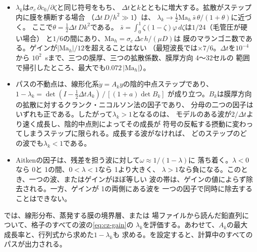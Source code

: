 \begin{itemize}
  \item $\lambda_k$は$\sigma_c\,\partial c_0/\partial\zeta$と同じ符号をもち、
    $\Delta t$と$k$とともに増大する。拡散がステップ内に膜を横断する場合
    （$\Delta t\,D/h^2 \gg 1$）は、
    $\lambda_k \to \tfrac12 \mathrm{Ma}_h\,\bar s\,\theta/(1+\theta)$に近づく。
    ここで$\theta = \tfrac12\Delta t\,D k^2$である。
    $\bar s = \int_0^1\zeta(1-\zeta)\varphi\,d\zeta$は$1/24$（毛管圧が硬い場合）
    と$1/6$の間にあり、$\mathrm{Ma}_h = \sigma_c\,\Delta c\,h/(\mu D)$は
    膜のマランゴニ数である。ゲインが$|\mathrm{Ma}_h|/12$を超えることはない
    （最短波長では$\times 7/6$。$\Delta t$を$10^{-4}$から
    $10^{2}$~\si{\second}まで、三つの膜厚、三つの拡散係数、膜厚方向 4～32セルの
    範囲で掃引したところ、最大でも$0.072\,|\mathrm{Ma}_h|$）。
  \item パスの不動点は、線形化系$\dot y = A_k y$の陰的中点ステップであり、
    $1 - \lambda_k = \det(I - \tfrac12\Delta t A_k)\,/\,[(1+a)\det B_k]$
    が成り立つ。$B_k$は膜厚方向の拡散に対するクランク・ニコルソン法の因子であり、
    分母の二つの因子はいずれも正である。したがって$\lambda_k > 1$となるのは、
    モデルのある波が$2/\Delta t$より速く成長し、陰的中点則によってその成長が
    符号の反転する摂動に変わってしまうステップに限られる。成長する波がなければ、
    どのステップのどの波でも$\lambda_k < 1$である。
  \item Aitkenの因子は、残差を担う波に対して$\omega \approx 1/(1-\lambda)$に
    落ち着く。$\lambda < 0$なら 0と 1の間、$0 < \lambda < 1$なら 1より大きく、
    $\lambda > 1$なら負になる。このとき、一つの波、またはゲインがほぼ等しい
    波の帯は、ゲインの値によらず除去される。一方、ゲインが 1の両側にある波を
    一つの因子で同時に除去することはできない。
\end{itemize}

では、線形分布、蒸発する膜の境界層、または
場ファイルから読んだ鉛直列について、格子のすべての波の\cref{eq:cz-gain}の
$\lambda_k$を評価する。あわせて、$A_k$の最大成長率と、行列式から求めた$1-\lambda_k$も
求める。を設定すると、計算中のすべてのパスが出力される。

